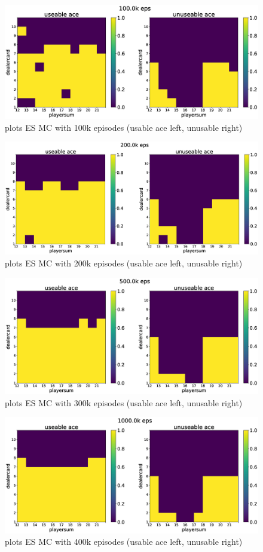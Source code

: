 \documentclass[11pt,a4paper]{article}
\begin{document}
\begin{figure}[h!]
  \includegraphics[width=.7\textwidth]{es-v3-100k.eps}
  \centering
  \caption{plots ES MC with 100k episodes (usable ace left, unusable right)}
  \label{fig4}
\end{figure}

\begin{figure}[h!]
  \includegraphics[width=.7\textwidth]{es-v3-200k.eps}
  \centering
  \caption{plots ES MC with 200k episodes (usable ace left, unusable right)}
  \label{fig5}
\end{figure}

\begin{figure}[h!]
  \includegraphics[width=.7\textwidth]{es-v3-500k.eps}
  \centering
  \caption{plots ES MC with 300k episodes (usable ace left, unusable right)}
  \label{fig6}
\end{figure}

\begin{figure}[h!]
  \includegraphics[width=.7\textwidth]{es-v3-1000k.eps}
  \centering
  \caption{plots ES MC with 400k episodes (usable ace left, unusable right)}
  \label{fig7}
\end{figure}
\end{document}
